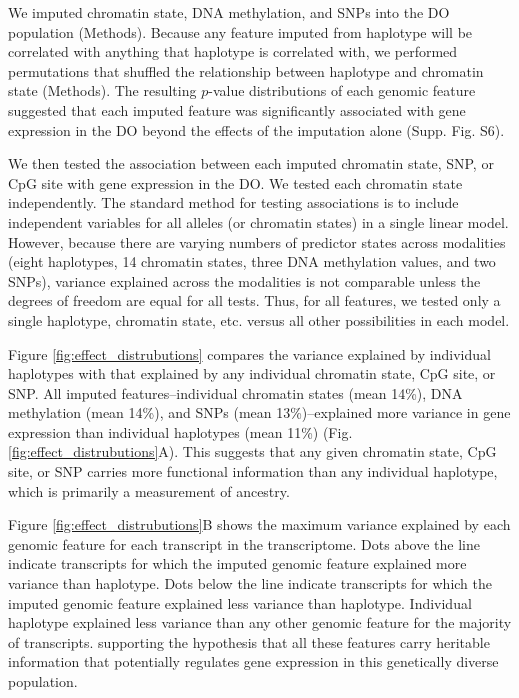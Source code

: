 \documentclass[
  11pt,
]{article}
\begin{document}
We imputed chromatin state, DNA methylation, and SNPs into the DO
population (Methods). Because any feature imputed from haplotype will be
correlated with anything that haplotype is correlated with, we performed
permutations that shuffled the relationship between haplotype and
chromatin state (Methods). The resulting \(p\)-value distributions of
each genomic feature suggested that each imputed feature was
significantly associated with gene expression in the DO beyond the
effects of the imputation alone (Supp. Fig. S6).

We then tested the association between each imputed chromatin state,
SNP, or CpG site with gene expression in the DO. We tested each
chromatin state independently. The standard method for testing
associations is to include independent variables for all alleles (or
chromatin states) in a single linear model. However, because there are
varying numbers of predictor states across modalities (eight haplotypes,
14 chromatin states, three DNA methylation values, and two SNPs),
variance explained across the modalities is not comparable unless the
degrees of freedom are equal for all tests. Thus, for all features, we
tested only a single haplotype, chromatin state, etc. versus all other
possibilities in each model.

Figure \ref{fig:effect_distrubutions} compares the variance explained by
individual haplotypes with that explained by any individual chromatin
state, CpG site, or SNP. All imputed features--individual chromatin
states (mean 14\%), DNA methylation (mean 14\%), and SNPs (mean
13\%)--explained more variance in gene expression than individual
haplotypes (mean 11\%) (Fig. \ref{fig:effect_distrubutions}A). This
suggests that any given chromatin state, CpG site, or SNP carries more
functional information than any individual haplotype, which is primarily
a measurement of ancestry.

Figure \ref{fig:effect_distrubutions}B shows the maximum variance
explained by each genomic feature for each transcript in the
transcriptome. Dots above the line indicate transcripts for which the
imputed genomic feature explained more variance than haplotype. Dots
below the line indicate transcripts for which the imputed genomic
feature explained less variance than haplotype. Individual haplotype
explained less variance than any other genomic feature for the majority
of transcripts. supporting the hypothesis that all these features carry
heritable information that potentially regulates gene expression in this
genetically diverse population.
\end{document}
